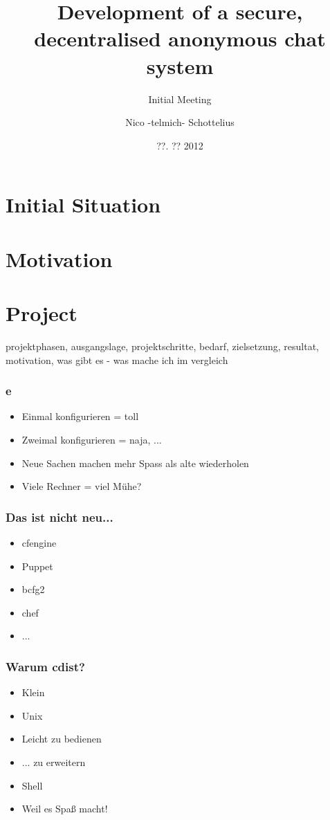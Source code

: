 \documentclass{beamer}
\title{Development of a secure, decentralised anonymous chat system}
\subtitle{Initial Meeting}
\author{Nico -telmich- Schottelius}
\date{??. ?? 2012}
\begin{document}
\frame{\titlepage}

\frame{\tableofcontents}

\section{Initial Situation}
\section{Motivation}
\section{Project}

projektphasen, ausgangslage, projektschritte, bedarf, zielsetzung, resultat,
motivation, was gibt es - was mache ich im vergleich

\frame
{
  \frametitle{e}
  \begin{itemize}[<+->]
  \item Einmal konfigurieren = toll
  \item Zweimal konfigurieren = naja, ...
  \item Neue Sachen machen mehr Spass als alte wiederholen
  \item Viele Rechner = viel Mühe?
  \end{itemize}
}

\frame
{
  \frametitle{Das ist nicht neu...}
  \begin{itemize}[<+->]
  \item cfengine
  \item Puppet
  \item bcfg2
  \item chef
  \item ...
  \end{itemize}
}

\frame
{
  \frametitle{Warum cdist?}
  \begin{itemize}[<+->]
     \item Klein
     \item Unix
     \item Leicht zu bedienen
     \item ... zu erweitern
     \item Shell
     \item Weil es Spaß macht!
  \end{itemize}
}
\end{document}
